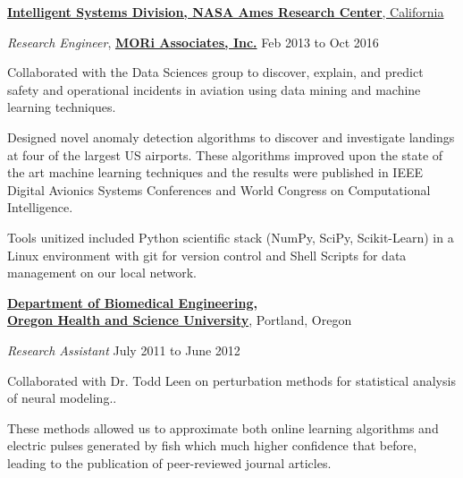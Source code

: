 \documentclass[10pt]{article}
\newenvironment{outerlist}[1][\enskip$\circ$]%
        {\begin{itemize}[#1]}{\end{itemize}%
         \vspace{-.6\baselineskip}}
\newenvironment{innerlist}[1][\enskip$\circ$]%
        {\begin{compactitem}[#1]}{\end{compactitem}}
\begin{document}
\href{http://ti.arc.nasa.gov/}{\textbf{Intelligent Systems Division, NASA Ames Research Center}, California}
\begin{outerlist}
\item[] \textit{Research Engineer}, \href{http://www.moriassociates.com/}{\textbf{MORi Associates, Inc.}} %
\hfill{Feb 2013 to Oct 2016}

  \begin{innerlist}
    \item Collaborated with the Data Sciences group to discover, explain, and predict safety and operational incidents in aviation using data mining and machine learning techniques.
    \item Designed novel anomaly detection algorithms to discover and investigate landings at four of the largest US airports. These algorithms improved upon the state of the art machine learning techniques and the results were published in {\sc IEEE Digital Avionics Systems Conferences} and { World Congress on Computational Intelligence}.
    \item Tools unitized included  {\sc Python} scientific stack ({\sc NumPy, SciPy, Scikit-Learn}) in a  {\sc Linux} environment with {\sc git} for version control and {\sc Shell Scripts} for data management on our local network.

\end{innerlist}
\end{outerlist}
\medbreak
\href{http://www.ogi.edu/bme}{\textbf{Department of Biomedical Engineering, \\Oregon Health and Science University}},
Portland, Oregon
\begin{outerlist}
\item[] \textit{Research Assistant}%
    \hfill {July 2011 to June 2012}
     \begin{innerlist}
     \item Collaborated with Dr. Todd Leen on perturbation methods for statistical analysis of neural modeling..
     \item These methods allowed us to approximate both online learning algorithms and electric pulses generated by fish which much higher confidence that before, leading to the publication of peer-reviewed journal articles.
     \end{innerlist}
   \end{outerlist}
  
\end{document}
